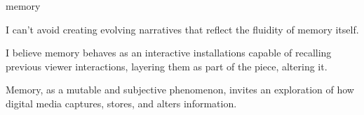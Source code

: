 



\begin{center}
\vspace*{\fill}
\Huge memory

\vspace{2cm}

\begin{flushright}
\large
\end{flushright}
\vspace*{\fill}
\end{center}

\normalsize


I can't avoid creating evolving narratives that reflect the fluidity of memory itself. 

I believe memory behaves as an interactive installations capable of recalling previous viewer interactions, layering them as part of the piece, altering it. 

Memory, as a mutable and subjective phenomenon, invites an exploration of how digital media captures, stores, and alters information.

